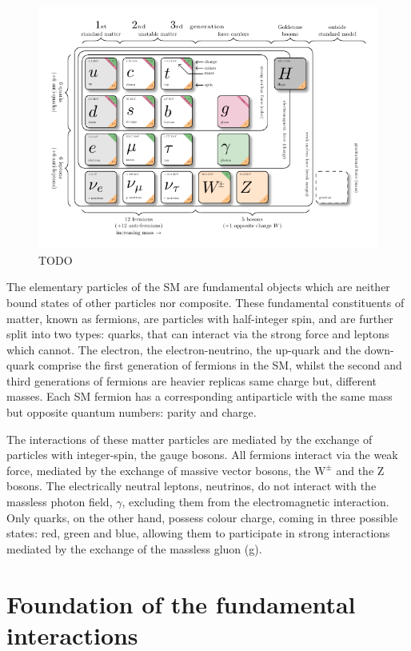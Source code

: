 \begin{figure}[h]
\centering
\includegraphics[width= 1\textwidth]{Figures/Introduction/Particles.pdf}
\caption{TODO \cite{Figure_ParticleContent}}\label{Figure:Introduction_1}
\end{figure}

The elementary particles of the SM are fundamental objects which are neither bound states of other particles nor composite. These fundamental constituents of matter, known as fermions, are particles with half-integer spin, and are further split into two types: quarks, that can interact via the strong force and leptons which cannot.  The electron, the electron-neutrino, the up-quark and the down-quark comprise the first generation of fermions in the SM, whilst the second and third generations of fermions are heavier replicas \ie same charge but, different masses. Each SM fermion has a corresponding antiparticle with the same mass but opposite quantum numbers: parity and charge.

The interactions of these matter particles are mediated by the exchange of particles with integer-spin, the gauge bosons. All fermions interact via the weak force, mediated by the exchange of massive vector bosons, the $\text{W}^\pm$ and the Z bosons. The electrically neutral leptons, neutrinos, do not interact with the massless photon field, $\gamma$, excluding them from the electromagnetic interaction. Only quarks, on the other hand, possess colour charge, coming in three possible states: red, green and blue, allowing them to participate in strong interactions mediated by the exchange of the massless gluon (g). 

\section{Foundation of the fundamental interactions}

